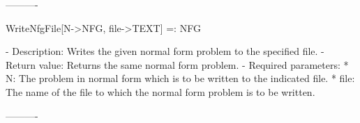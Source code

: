 ----------

WriteNfgFile[N->NFG, file->TEXT] =: NFG

   -	Description:  Writes the given normal form problem to the specified 
	file.  
   -	Return value:  Returns the same normal form problem.
   -	Required parameters:
	  *  N:  The problem in normal form which is to be written to the
		indicated file.
	  *  file:  The name of the file to which the normal form problem is
		to be written.

----------





























